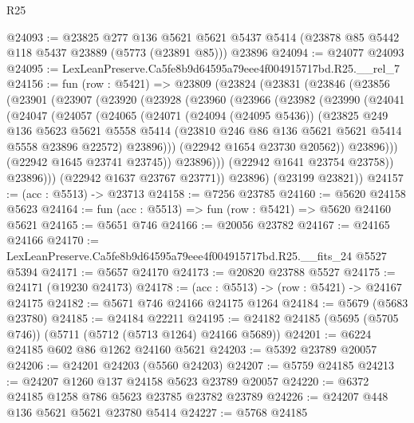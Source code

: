 \begin{lexlean}{R25}
\begin{coremodule}
@24093 := @23825
    @277
    @136
    @5621
    @5621
    @5437
    @5414
    (@23878 @85 @5442 @118 @5437 @23889 (@5773 (@23891 @85)))
    @23896
@24094 := @24077 @24093
@24095 := LexLeanPreserve.Ca5fe8b9d64595a79eee4f004915717bd.R25.__rel_7
@24156 := fun (row : @5421) =>
  @23809
    (@23824
      (@23831
        (@23846
          (@23856
            (@23901
              (@23907
                (@23920
                  (@23928
                    (@23960
                      (@23966
                        (@23982
                          (@23990
                            (@24041
                              (@24047
                                (@24057
                                  (@24065
                                    (@24071
                                      (@24094 (@24095 @5436))
                                      (@23825
                                        @249
                                        @136
                                        @5623
                                        @5621
                                        @5558
                                        @5414
                                        (@23810 @246 @86 @136 @5621 @5621 @5414 @5558 @23896 @22572)
                                        @23896)))
                                  (@22942 @1654 @23730 @20562))
                                @23896)))
                          (@22942 @1645 @23741 @23745))
                        @23896)))
                  (@22942 @1641 @23754 @23758))
                @23896)))
          (@22942 @1637 @23767 @23771))
        @23896)
      (@23199 @23821))
@24157 := (acc : @5513) -> @23713
@24158 := @7256 @23785
@24160 := @5620 @24158 @5623
@24164 := fun (acc : @5513) => fun (row : @5421) => @5620 @24160 @5621
@24165 := @5651 @746
@24166 := @20056 @23782
@24167 := @24165 @24166
@24170 := LexLeanPreserve.Ca5fe8b9d64595a79eee4f004915717bd.R25.__fits_24 @5527 @5394
@24171 := @5657 @24170
@24173 := @20820 @23788 @5527
@24175 := @24171 (@19230 @24173)
@24178 := (acc : @5513) -> (row : @5421) -> @24167 @24175
@24182 := @5671 @746 @24166 @24175 @1264
@24184 := @5679 (@5683 @23780)
@24185 := @24184 @22211
@24195 := @24182 @24185 (@5695 (@5705 @746)) (@5711 (@5712 (@5713 @1264) @24166 @5689))
@24201 := @6224 @24185 @602 @86 @1262 @24160 @5621
@24203 := @5392 @23789 @20057
@24206 := @24201 @24203 (@5560 @24203)
@24207 := @5759 @24185
@24213 := @24207 @1260 @137 @24158 @5623 @23789 @20057
@24220 := @6372 @24185 @1258 @786 @5623 @23785 @23782 @23789
@24226 := @24207 @448 @136 @5621 @5621 @23780 @5414
@24227 := @5768 @24185

\end{coremodule}
\end{lexlean}
